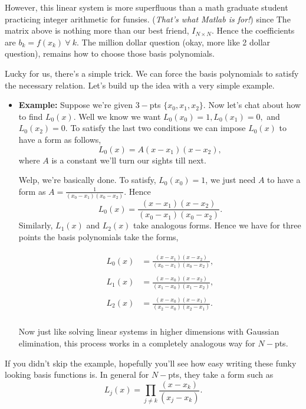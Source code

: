 \documentclass[paper=a4, fontsize=11pt]{scrartcl} %
\numberwithin{equation}{section} %
\numberwithin{figure}{section} %
\numberwithin{table}{section} %
\begin{document}
However, this linear system is more superfluous than a math graduate student practicing integer arithmetic for funsies. (\emph{That's what Matlab is for!}) since The matrix above is nothing more than our best friend, $I_{N\times N}$. Hence the coefficients are $b_k = f(x_k)\  \forall \ k$. The million dollar question (okay, more like 2 dollar question), remains how to choose those basis polynomials. 

Lucky for us, there's a simple trick. We can force the basis polynomials to satisfy the necessary relation. Let's build up the idea with a very simple example. \\

\begin{itemize}
\item {\bf{Example:}} Suppose we're given $3-$pts $\{x_0,x_1,x_2\}$. Now let's chat about how to find $L_{0}(x).$ Well we know we want $L_0(x_0) = 1,  L_0(x_1) = 0,$ and $L_0(x_2)=0.$ To satisfy the last two conditions we can impose $L_0(x)$ to have a form as follows, $$L_0(x) = A (x-x_1)(x-x_2),$$ where $A$ is a constant we'll turn our sights till next.

Welp, we're basically done. To satisfy, $L_0(x_0) = 1$, we just need $A$ to have a form as $A=\frac{1}{(x_0-x_1)(x_0-x_2)}.$ Hence $$L_0(x) = \frac{(x-x_1)(x-x_2)}{(x_0-x_1)(x_0-x_2)}.$$ Similarly, $L_1(x)$ and $L_2(x)$ take analogous forms. Hence we have for three points the basis polynomials take the forms, 

\begin{align}
\nonumber
\begin{split}
L_0(x) &= \frac{(x-x_1)(x-x_2)}{(x_0-x_1)(x_0-x_2)},  \\ \\
L_1(x) &= \frac{(x-x_0)(x-x_2)}{(x_1-x_0)(x_1-x_2)}, \\ \\
L_2(x) &= \frac{(x-x_0)(x-x_1)}{(x_2-x_0)(x_2-x_1)}. \\
\end{split}
\end{align}

Now just like solving linear systems in higher dimensions with Gaussian elimination, this process works in a completely analogous way for $N-$pts. 

\end{itemize}

If you didn't skip the example, hopefully you'll see how easy writing these funky looking basis functions is. In general for $N-$pts, they take a form such as $$L_{j}(x) = \prod_{j\neq k} \frac{ (x-x_k) }{(x_j-x_k)}.$$
\end{document}
